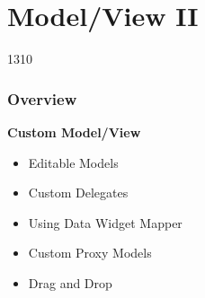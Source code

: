%
%
%
%

\section{Model/View II}

\begin{slide}{1310}
 \frametitle{Overview}
  
  \textbf{Custom Model/View} 
  \begin{itemize}
  \item Editable Models
  \item Custom Delegates
  \item Using Data Widget Mapper
  \item Custom Proxy Models
  \item Drag and Drop
  \end{itemize}
\end{slide}

% 
% 
% 
% 
%
%




